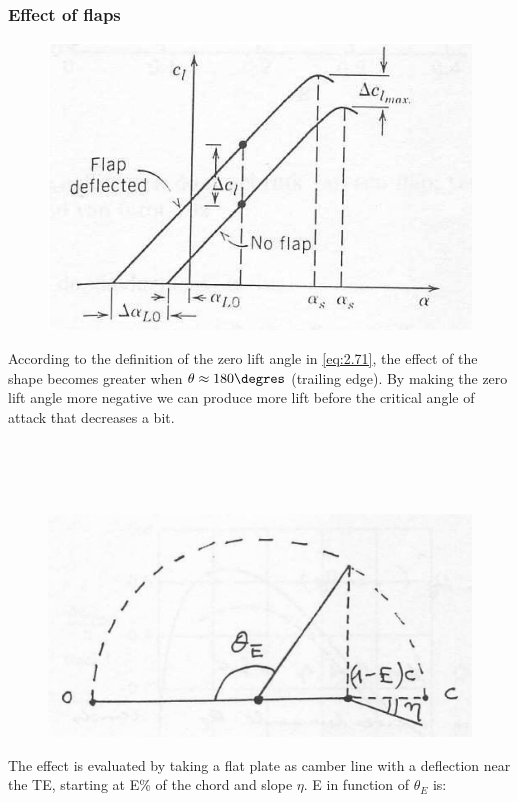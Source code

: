 \subsubsection{Effect of flaps}
	\begin{figure}
	\vspace{-5mm}
	\includegraphics[scale=0.1]{ch2/36}
	\end{figure}
	According to the definition of the zero lift angle in \eqref{eq:2.71}, the effect of the shape becomes greater when $\theta \approx 180\degres$ (trailing edge). By making the zero lift angle more negative we can produce more lift before the critical angle of attack that decreases a bit. 
	
	\ \\\\\\
	
	\begin{figure}
	\vspace{-5mm}
	\includegraphics[scale=0.1]{ch2/37}
	\end{figure}
	The effect is evaluated by taking a flat plate as camber line with a deflection near the TE, starting at E\% of the chord and slope $\eta$. E in function of $\theta _E$ is: 
	
